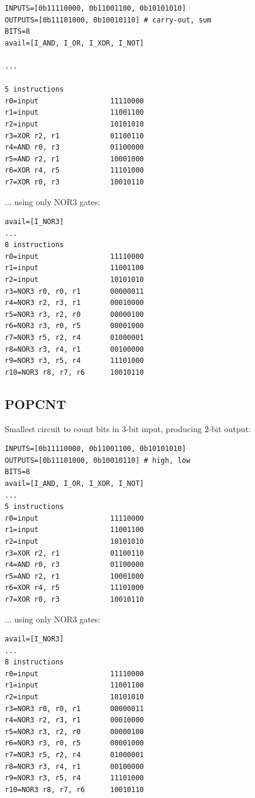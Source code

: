 \begin{lstlisting}
INPUTS=[0b11110000, 0b11001100, 0b10101010]
OUTPUTS=[0b11101000, 0b10010110] # carry-out, sum
BITS=8
avail=[I_AND, I_OR, I_XOR, I_NOT]

...

5 instructions
r0=input                 11110000
r1=input                 11001100
r2=input                 10101010
r3=XOR r2, r1            01100110
r4=AND r0, r3            01100000
r5=AND r2, r1            10001000
r6=XOR r4, r5            11101000
r7=XOR r0, r3            10010110
\end{lstlisting}

... using only NOR3 gates:

\begin{lstlisting}
avail=[I_NOR3]
...
8 instructions
r0=input                 11110000
r1=input                 11001100
r2=input                 10101010
r3=NOR3 r0, r0, r1       00000011
r4=NOR3 r2, r3, r1       00010000
r5=NOR3 r3, r2, r0       00000100
r6=NOR3 r3, r0, r5       00001000
r7=NOR3 r5, r2, r4       01000001
r8=NOR3 r3, r4, r1       00100000
r9=NOR3 r3, r5, r4       11101000
r10=NOR3 r8, r7, r6      10010110
\end{lstlisting}

\subsection{POPCNT}

Smallest circuit to count bits in 3-bit input, producing 2-bit output:

\begin{lstlisting}
INPUTS=[0b11110000, 0b11001100, 0b10101010]
OUTPUTS=[0b11101000, 0b10010110] # high, low
BITS=8
avail=[I_AND, I_OR, I_XOR, I_NOT]
...
5 instructions
r0=input                 11110000
r1=input                 11001100
r2=input                 10101010
r3=XOR r2, r1            01100110
r4=AND r0, r3            01100000
r5=AND r2, r1            10001000
r6=XOR r4, r5            11101000
r7=XOR r0, r3            10010110
\end{lstlisting}

... using only NOR3 gates:

\begin{lstlisting}
avail=[I_NOR3]
...
8 instructions
r0=input                 11110000
r1=input                 11001100
r2=input                 10101010
r3=NOR3 r0, r0, r1       00000011
r4=NOR3 r2, r3, r1       00010000
r5=NOR3 r3, r2, r0       00000100
r6=NOR3 r3, r0, r5       00001000
r7=NOR3 r5, r2, r4       01000001
r8=NOR3 r3, r4, r1       00100000
r9=NOR3 r3, r5, r4       11101000
r10=NOR3 r8, r7, r6      10010110
\end{lstlisting}

